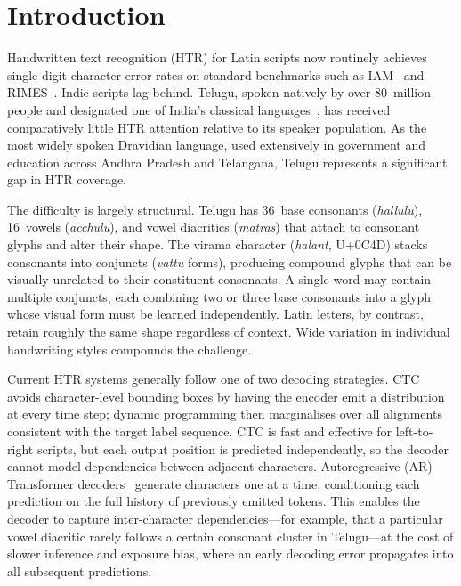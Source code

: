 \documentclass[pdflatex,sn-mathphys-num]{sn-jnl}
\begin{document}
\section{Introduction}\label{sec:intro}

Handwritten text recognition (HTR) for Latin scripts now routinely achieves single-digit character error rates on standard benchmarks such as IAM~\cite{vaswani2017attention} and RIMES~\cite{li2023trocr}. Indic scripts lag behind. Telugu, spoken natively by over 80~million people and designated one of India's classical languages~\cite{ethnologue2024}, has received comparatively little HTR attention relative to its speaker population. As the most widely spoken Dravidian language, used extensively in government and education across Andhra Pradesh and Telangana, Telugu represents a significant gap in HTR coverage.

The difficulty is largely structural. Telugu has 36~base consonants (\textit{hallulu}), 16~vowels (\textit{acchulu}), and vowel diacritics (\textit{matras}) that attach to consonant glyphs and alter their shape. The virama character (\textit{halant}, U+0C4D) stacks consonants into conjuncts (\textit{vattu} forms), producing compound glyphs that can be visually unrelated to their constituent consonants. A single word may contain multiple conjuncts, each combining two or three base consonants into a glyph whose visual form must be learned independently. Latin letters, by contrast, retain roughly the same shape regardless of context. Wide variation in individual handwriting styles compounds the challenge.

Current HTR systems generally follow one of two decoding strategies. CTC~\cite{graves2006ctc} avoids character-level bounding boxes by having the encoder emit a distribution at every time step; dynamic programming then marginalises over all alignments consistent with the target label sequence. CTC is fast and effective for left-to-right scripts, but each output position is predicted independently, so the decoder cannot model dependencies between adjacent characters. Autoregressive (AR) Transformer decoders~\cite{vaswani2017attention} generate characters one at a time, conditioning each prediction on the full history of previously emitted tokens. This enables the decoder to capture inter-character dependencies---for example, that a particular vowel diacritic rarely follows a certain consonant cluster in Telugu---at the cost of slower inference and exposure bias, where an early decoding error propagates into all subsequent predictions.
\end{document}
